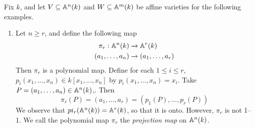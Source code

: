 \begin{example}\label{example_11.3}
  Fix $k$, and let $V \subseteq \mathbb{A}^n(k)$ and $W \subseteq \mathbb{A}^m(k)$
  be affine varieties for the following examples.
  \begin{enumerate}
    \item[(1)] Let $n \geq r$, and define the following map
      \begin{equation*}
        \begin{split}
          \pi_r:\mathbb{A}^n(k) & \xrightarrow{} \mathbb{A}^r(k)  \\
          (a_1, \dots, a_n) & \xrightarrow{} (a_1, \dots, a_r)  \\
        \end{split}
      \end{equation*}
      Then $\pi_r$ is a polynomial map. Define for each $1 \leq i
      \leq r$, $p_i(x_1, \dots, x_n) \in k[x_1, \dots, x_n]$ by
      $p_i(x_1, \dots, x_n)=x_i$. Take $P=(a_1, \dots, a_n) \in
      \mathbb{A}^n(k)$,. Then
      \begin{equation*}
        \pi_r(P)=(a_1, \dots, a_r)=(p_1(P), \dots, p_r(P))
      \end{equation*}
      We observe that $pi_r(\mathbb{A}^n(k))=\mathbb{A}^r(k)$, so that it is onto.
      However, $\pi_r$ is not 1--1. We call the polynomial map
      $\pi_r$ the \textit{projection map} on $\mathbb{A}^n(k)$.


\end{enumerate}
\end{example}
